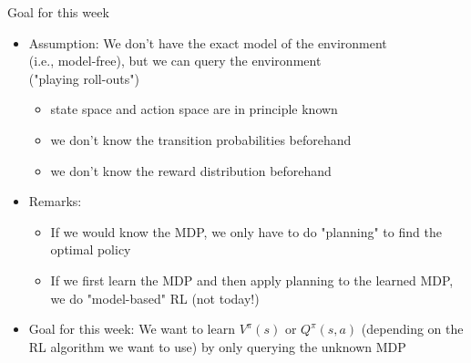 \begin{frame}[c]{Goal for this week}

\begin{itemize}
	\item Assumption: We don't have the exact model of the environment\\ (i.e., model-free), but we can query the environment\\ ("playing roll-outs")
	\begin{itemize}
		\item state space and action space are in principle known
		\item we don't know the transition probabilities beforehand
		\item we don't know the reward distribution beforehand
	\end{itemize}
	\medskip
	\pause
	\item Remarks:
	\begin{itemize}
		\item If we would know the MDP, we only have to do "planning" to find the optimal policy
		\item If we first learn the MDP and then apply planning to the learned MDP, we do "model-based" RL (not today!)
	\end{itemize}
	\medskip\pause
	\item Goal for this week: We want to learn $V^\pi(s)$ or $Q^\pi(s,a)$ (depending on the RL algorithm we want to use) by only querying the unknown MDP
\end{itemize}


\end{frame}



